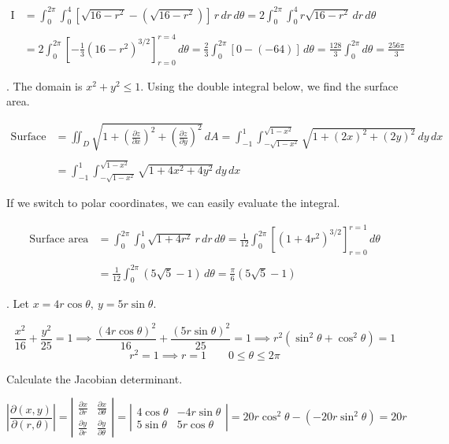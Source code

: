 \documentclass{article}
\begin{document}
\begin{align*}\mathrm{I}&=\int_0^{2\pi}\int_0^4\left[\sqrt{16-r^2}-\left(\sqrt{16-r^2}\right)\right]\,r\,dr\,d\theta=2\int_0^{2\pi}\int_0^4r\sqrt{16-r^2}\,dr\,d\theta\\\\&=2\int_0^{2\pi}\left[-\frac13\left(16-r^2\right)^{3/2}\right]_{r=0}^{r=4}\,d\theta=\frac23\int_0^{2\pi}\left[0-\left(-64\right)\right]\,d\theta=\frac{128}3\int_0^{2\pi}d\theta=\boxed{\frac{256\pi}3}\end{align*}

\hfill

. The domain is $x^2+y^2\leq1$. Using the double integral below, we find the surface area.

\begin{align*}
\text{Surface area}&=\iint_D\sqrt{1+\left(\frac{\partial z}{\partial x}\right)^2 +\left(\frac{\partial z}{\partial y}\right)^2}\,dA=\int_{-1}^1\int_{-\sqrt{1-x^2}}^{\sqrt{1-x^2}}\sqrt{1+\left(2x\right)^2 +\left(2y\right)^2}\,dy\,dx\\\\&=\int_{-1}^1\int_{-\sqrt{1-x^2}}^{\sqrt{1-x^2}}\sqrt{1+4x^2+4y^2}\,dy\,dx
\end{align*}

\hfill

\noindent If we switch to polar coordinates, we can easily evaluate the integral.

\begin{align*}\text{Surface area}&=\int_0^{2\pi}\int_0^1\sqrt{1+4r^2}\,r\,dr\,d\theta=\frac1{12}\int_0^{2\pi}\left[\left(1+4r^2\right)^{3/2}\right]_{r=0}^{r=1}\,d\theta\\\\&=\frac1{12}\int_0^{2\pi}\left(5\sqrt5-1\right)\,d\theta=\boxed{\frac\pi6\left(5\sqrt5-1\right)}\end{align*}

\hfill

. Let $x=4r\cos\theta,\:y=5r\sin\theta$.

\[\frac{x^2}{16}+\frac{y^2}{25}=1\implies\frac{(4r\cos\theta)^2}{16}+\frac{(5r\sin\theta)^2}{25}=1\implies r^2\left(\sin^2\theta+\cos^2\theta\right)=1\]
\[r^2=1\implies r=1\quad\quad0\leq\theta\leq2\pi\]

\newpage

\noindent Calculate the Jacobian determinant.

\hfill

\[
\left|\frac{\partial(x,y)}{\partial(r,\theta)}\right|=\left|\begin{array}{cc}
\displaystyle\frac{\partial x}{\partial r}&\displaystyle\frac{\partial x}{\partial\theta}\\[1em]
\displaystyle\frac{\partial y}{\partial r}&\displaystyle\frac{\partial y}{\partial\theta}
\end{array}\right|=\left|\begin{array}{cc}
4\cos\theta&-4r\sin\theta\\
5\sin\theta&5r\cos\theta
\end{array}\right|=20r\cos^2\theta-\left(-20r\sin^2\theta\right)=20r
\]
\end{document}
